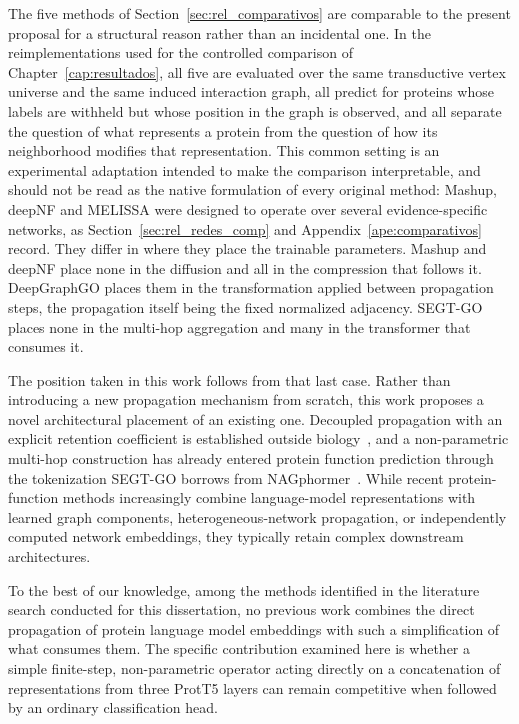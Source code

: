 \documentclass[Ingles]{ic-tese-v3}
\begin{document}
The five methods of Section~\ref{sec:rel_comparativos} are comparable to the present proposal for a
structural reason rather than an incidental one. In the reimplementations used for the controlled
comparison of Chapter~\ref{cap:resultados}, all five are evaluated over the same transductive vertex
universe and the same induced interaction graph, all predict for proteins whose labels are withheld
but whose position in the graph is observed, and all separate the question of what represents a
protein from the question of how its neighborhood modifies that representation. This common setting
is an experimental adaptation intended to make the comparison interpretable, and should not be read
as the native formulation of every original method: Mashup, deepNF and MELISSA were designed to
operate over several evidence-specific networks, as Section~\ref{sec:rel_redes_comp} and
Appendix~\ref{ape:comparativos} record. They differ in where they place the trainable parameters.
Mashup and deepNF place none in the diffusion and all in the compression that follows it.
DeepGraphGO places them in the transformation applied between propagation steps, the propagation
itself being the fixed normalized adjacency. SEGT-GO places none in the multi-hop aggregation and
many in the transformer that consumes it.

The position taken in this work follows from that last case. Rather than introducing a new propagation mechanism from scratch, this work proposes a novel architectural placement of an existing one. Decoupled propagation with an explicit retention coefficient is established outside biology~\cite{wu2019simplifying,klicpera2019predict}, and a non-parametric multi-hop construction has already entered protein function prediction through the tokenization SEGT-GO borrows from NAGphormer~\cite{chen2023nagphormer,wang2025segtgo}. While recent protein-function methods increasingly combine language-model representations with learned graph components, heterogeneous-network propagation, or independently computed network embeddings, they typically retain complex downstream architectures.

To the best of our knowledge, among the methods identified in the literature search conducted for this dissertation, no previous work combines the direct propagation of protein language model embeddings with such a simplification of what consumes them. The specific contribution examined here is whether a simple finite-step, non-parametric operator acting directly on a concatenation of representations from three ProtT5 layers can remain competitive when followed by an ordinary classification head. 
\end{document}
